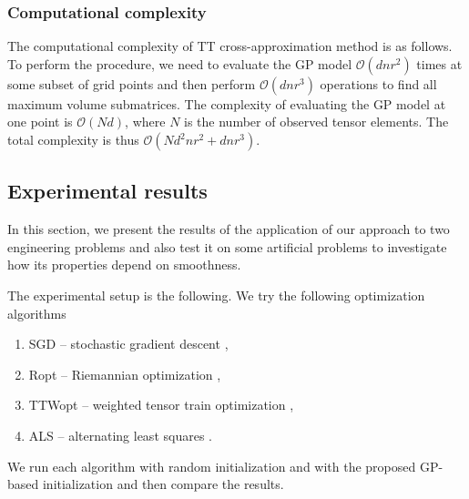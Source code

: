 \subsubsection{Computational complexity}
The computational complexity of TT cross-approximation method is as follows.
To perform the procedure, we need to evaluate the GP model $\mathcal{O}(dnr^2)$ times at some subset of grid points
and then perform $\mathcal{O}(dnr^3)$ operations to find all maximum volume submatrices.
The complexity of evaluating the GP model at one point is $\mathcal{O}(Nd)$, where $N$ is the number of observed tensor elements.
The total complexity is thus $\mathcal{O}(Nd^2nr^2 + dnr^3)$.

\subsection{Experimental results}
\label{sec:tensor_completion_experiments}
In this section, we present the results of the application of our approach
to two engineering problems and also test it on some artificial problems to investigate how its properties depend on smoothness.

The experimental setup is the following.
We try the following optimization algorithms
\begin{enumerate}
    \item SGD -- stochastic gradient descent \citep{zhao2018high},
    \item Ropt -- Riemannian optimization \citep{steinlechner2016riemannian},
    \item TTWopt -- weighted tensor train optimization \citep{zhao2018high},
    \item ALS  -- alternating least squares \citep{grasedyck2013alternating}.
\end{enumerate}
We run each algorithm with random initialization and with the
proposed GP-based initialization and then compare the results.


